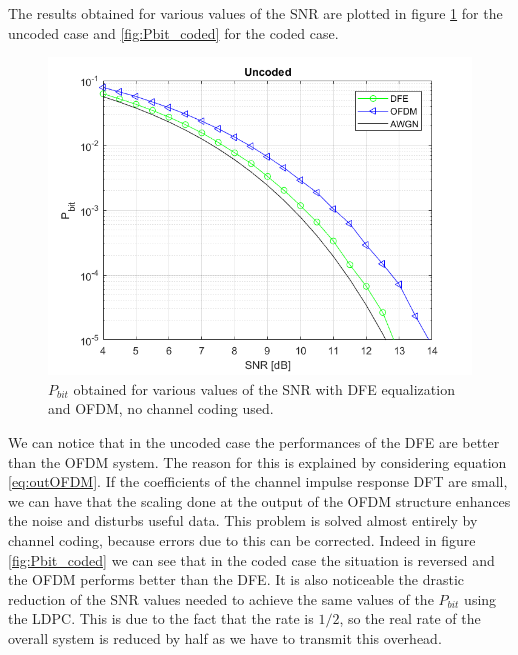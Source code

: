 \documentclass[a4paper,11.5pt]{article}
\begin{document}
The results obtained for various values of the SNR are plotted in figure \ref{fig:Pbit_uncoded} for the uncoded case and \ref{fig:Pbit_coded} for the coded case.


\begin{figure}[H]
	\begin{center}   
		\includegraphics[width=\textwidth]{figs/Pbit_uncoded.png} 
		\caption{$P_{bit}$ obtained for various values of the SNR with DFE equalization and OFDM, no channel coding used.}
		\label{fig:Pbit_uncoded}
	\end{center}
\end{figure}

We can notice that in the uncoded case the performances of the DFE are better than the OFDM system. The reason for this is explained by considering equation \ref{eq:outOFDM}. If the coefficients of the channel impulse response DFT are small, we can have that the scaling done at the output of the OFDM structure enhances the noise and disturbs useful data. This problem is solved almost entirely by channel coding, because errors due to this can be corrected. Indeed in figure \ref{fig:Pbit_coded} we can see that in the coded case the situation is reversed and the OFDM performs better than the DFE.
It is also noticeable the drastic reduction of the SNR values needed to achieve the same values of the $P_{bit}$ using the LDPC. This is due to the fact that the rate is $1/2$, so the real rate of the overall system is reduced by half as we have to transmit this overhead.
\end{document}
